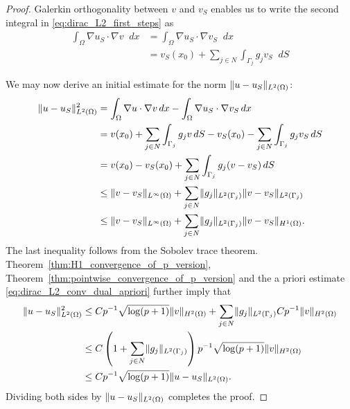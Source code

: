 \documentclass[english, 12pt, a4paper, sci, utf8, a-2b, online]{aaltothesis}
\theoremstyle{definition}
\theoremstyle{plain}
\DeclarePairedDelimiter\norm{\lVert}{\rVert}
\newcommand*\diff{\mathop{}\!d}
\numberwithin{equation}{section}
\begin{document}
\begin{proof}
    Galerkin orthogonality between $v$ and $v_S$
    enables us to write the second integral in \eqref{eq:dirac_L2_first_steps} as
    \begin{align*}
        \int_{\Omega} \nabla u_S \cdot \nabla v \diff x
        &= \int_{\Omega} \nabla u_S \cdot \nabla v_S \diff x \\
        &= v_S(x_0) + \sum_{j \in N} \int_{\Gamma_j} g_j v_S \diff S
    \end{align*}
    
    We may now derive an initial estimate for the norm
    $\norm{u - u_S}_{L^2(\Omega)}$:
    \begin{align*}
        \norm{u - u_S}_{L^2(\Omega)}^2
        &= \int_{\Omega} \nabla u \cdot \nabla v \diff x
            - \int_{\Omega} \nabla u_S \cdot \nabla v_S \diff x \\
        &= v(x_0) + \sum_{j \in N} \int_{\Gamma_j} g_j v \diff S
            - v_S(x_0) - \sum_{j \in N} \int_{\Gamma_j} g_j v_S \diff S \\
        &= v(x_0) - v_S(x_0)
            + \sum_{j \in N} \int_{\Gamma_j} g_j (v - v_S) \diff S \\
        &\leq \norm{v - v_S}_{L^{\infty}(\Omega)}
            + \sum_{j \in N} \norm{g_j}_{L^2(\Gamma_j)}
                \norm{v - v_S}_{L^2(\Gamma_j)} \\
        &\leq \norm{v - v_S}_{L^{\infty}(\Omega)}
            + \sum_{j \in N} \norm{g_j}_{L^2(\Gamma_j)}
                \norm{v - v_S}_{H^1(\Omega)}.
    \end{align*}
    The last inequality follows from the Sobolev trace theorem.
    Theorem~\ref{thm:H1_convergence_of_p_version},
    Theorem~\ref{thm:pointwise_convergence_of_p_version}
    and the a priori estimate \eqref{eq:dirac_L2_conv_dual_apriori}
    further imply that
    \begin{align*}
        \norm{u - u_S}_{L^2(\Omega)}^2
        &\leq C p^{-1} \sqrt{\log(p+1)} \norm{v}_{H^2(\Omega)}
            + \sum_{j \in N} \norm{g_j}_{L^2(\Gamma_j)}
                C p^{-1} \norm{v}_{H^2(\Omega)} \\
        &\leq C \left( 1 + \sum_{j \in N} \norm{g_j}_{L^2(\Gamma_j)} \right)
            p^{-1} \sqrt{\log(p+1)} \norm{v}_{H^2(\Omega)} \\
        &\leq C p^{-1} \sqrt{\log(p+1)} \norm{u - u_S}_{L^2(\Omega)}.
    \end{align*}
    Dividing both sides by $\norm{u - u_S}_{L^2(\Omega)}$ completes the proof.
\end{proof}

\clearpage
\thesisbibliography


\end{document}
